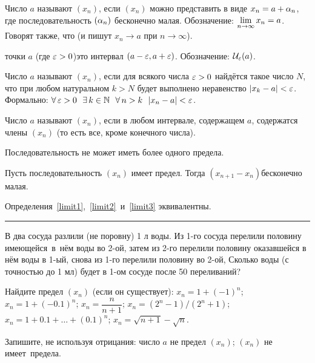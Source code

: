 \documentclass[a4paper,12pt]{article}
\begin{document}

\label{limit1}
Число $a$ называют  $(x_n)$, если $(x_n)$ можно представить в виде $x_n = a + \alpha_n$, где последовательность $(\alpha_n)$ бесконечно малая.
Обозначение: $\lim\limits_{n \rightarrow \infty} x_n = a$.
Говорят также, что  (и пишут $x_n \to a$ при $n \to \infty$).

 точки $a$ (где $\varepsilon > 0$)\т это интервал $(a-\varepsilon, a+\varepsilon)$. Обозначение: $\mathcal{U}_\varepsilon(a)$.

\label{limit2}
Число $a$ называют  $(x_n)$, если для всякого числа $\varepsilon > 0$ найдётся такое число $N$, что при любом натуральном $k > N$ будет выполнено неравенство $|x_k - a| < \varepsilon$.\\
Формально: $\forall\,\ep>0\ \ \exists\,k\in\N\ \ \forall\,n>k \ \ |x_n-a|<\ep$.

\label{limit3}
Число $a$ называют  $(x_n)$, если в любом интервале, содержащем $a$, содержатся  члены $(x_n)$ (то есть все, кроме конечного числа).

Последовательность не может иметь более одного предела.

Пусть последовательность $(x_n)$ имеет предел. Тогда $(x_{n+1} - x_n)$\т бесконечно малая.

Определения~\ref{limit1},~\ref{limit2}~и~\ref{limit3} эквивалентны.

\bigskip
\hrule
\bigskip

В два сосуда разлили (не поровну) 1 л воды. Из 1-го сосуда перелили половину имеющейся~в~нём воды во 2-ой, затем из 2-го перелили половину оказавшейся в нём воды в 1-ый, снова из 1-го  перелили половину во 2-ой,  Сколько воды (с точностью до 1 мл) будет в 1-ом сосуде после 50 переливаний?

Найдите предел $(x_n)$ (если он существует):
%
{ $x_n=1+(-1)^n$;}%
{ $x_n=1+(-0.1)^n$;}%
{ $x_n=\dfrac{n}{n+1}$;}
\medskip
{}%
{ $x_n=(2^n-1)/(2^n+1)$;}%
{ $x_n=1+0.1+\ldots+(0.1)^n$;}%
{ $x_n=\sqrt{n+1}-\sqrt{n}$.}%

Запишите, не используя отрицания:
 число $a$ не предел $(x_n)$;
 $(x_n)$ не имеет~предела.
\end{document}
